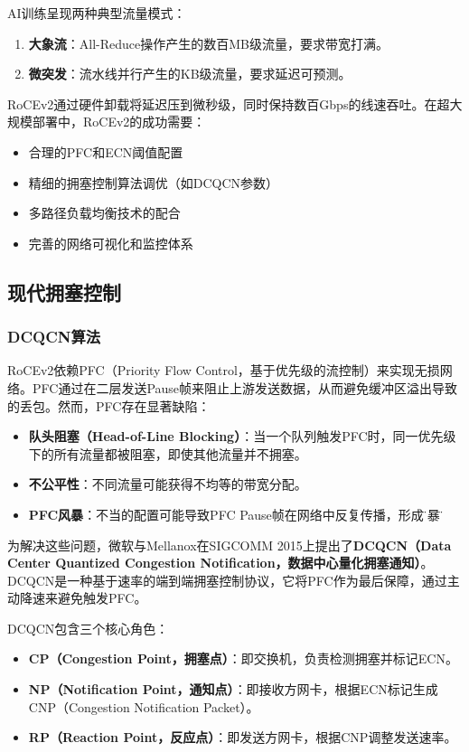 AI训练呈现两种典型流量模式：
\begin{enumerate}
    \item \textbf{大象流}：All-Reduce操作产生的数百MB级流量，要求带宽打满。
    \item \textbf{微突发}：流水线并行产生的KB级流量，要求延迟可预测。
\end{enumerate}

RoCEv2通过硬件卸载将延迟压到微秒级，同时保持数百Gbps的线速吞吐。在超大规模部署中，RoCEv2的成功需要：
\begin{itemize}
    \item 合理的PFC和ECN阈值配置
    \item 精细的拥塞控制算法调优（如DCQCN参数）
    \item 多路径负载均衡技术的配合
    \item 完善的网络可视化和监控体系
\end{itemize}

\subsection{现代拥塞控制}

\subsubsection{DCQCN算法}

RoCEv2依赖PFC（Priority Flow Control，基于优先级的流控制）来实现无损网络。PFC通过在二层发送Pause帧来阻止上游发送数据，从而避免缓冲区溢出导致的丢包。然而，PFC存在显著缺陷：

\begin{itemize}
    \item \textbf{队头阻塞（Head-of-Line Blocking）}：当一个队列触发PFC时，同一优先级下的所有流量都被阻塞，即使其他流量并不拥塞。
    \item \textbf{不公平性}：不同流量可能获得不均等的带宽分配。
    \item \textbf{PFC风暴}：不当的配置可能导致PFC Pause帧在网络中反复传播，形成\"风暴\"。
\end{itemize}

为解决这些问题，微软与Mellanox在SIGCOMM 2015上提出了\textbf{DCQCN（Data Center Quantized Congestion Notification，数据中心量化拥塞通知）}。DCQCN是一种基于速率的端到端拥塞控制协议，它将PFC作为最后保障，通过主动降速来避免触发PFC。

DCQCN包含三个核心角色：
\begin{itemize}
    \item \textbf{CP（Congestion Point，拥塞点）}：即交换机，负责检测拥塞并标记ECN。
    \item \textbf{NP（Notification Point，通知点）}：即接收方网卡，根据ECN标记生成CNP（Congestion Notification Packet）。
    \item \textbf{RP（Reaction Point，反应点）}：即发送方网卡，根据CNP调整发送速率。
\end{itemize}

